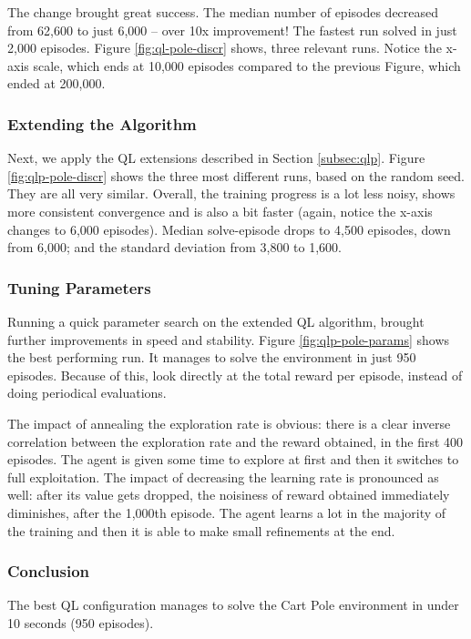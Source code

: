 \documentclass{article}
\begin{document}
The change brought great success. The median number of episodes decreased from 62,600 to just 6,000 -- over 10x improvement! The fastest run solved in just 2,000 episodes. Figure \ref{fig:ql-pole-discr} shows, three relevant runs. Notice the x-axis scale, which ends at 10,000 episodes compared to the previous Figure, which ended at 200,000.

\subsubsection{Extending the Algorithm}

Next, we apply the QL extensions described in Section \ref{subsec:qlp}. Figure \ref{fig:qlp-pole-discr} shows the three most different runs, based on the random seed. They are all very similar. Overall, the training progress is a lot less noisy, shows more consistent convergence and is also a bit faster (again, notice the x-axis changes to 6,000 episodes). Median solve-episode drops to 4,500 episodes, down from 6,000; and the standard deviation from 3,800 to 1,600. 

\subsubsection{Tuning Parameters}

Running a quick parameter search on the extended QL algorithm, brought further improvements in speed and stability. Figure \ref{fig:qlp-pole-params} shows the best performing run. It manages to solve the environment in just 950 episodes. Because of this, look directly at the total reward per episode, instead of doing periodical evaluations.

The impact of annealing the exploration rate is obvious: there is a clear inverse correlation between the exploration rate and the reward obtained, in the first 400 episodes. The agent is given some time to explore at first and then it switches to full exploitation. The impact of decreasing the learning rate is pronounced as well: after its value gets dropped, the noisiness of reward obtained immediately diminishes, after the 1,000th episode. The agent learns a lot in the majority of the training and then it is able to make small refinements at the end.

\subsubsection{Conclusion}

The best QL configuration manages to solve the Cart Pole environment in under 10 seconds (950 episodes).
\end{document}
